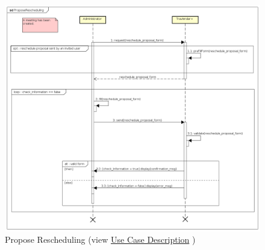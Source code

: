\begin{figure}[h]
\centering\includegraphics[width=\textwidth]{Images/SequenceDiagrams/Admin/ProposeRescheduling.png}{}
\caption[Propose Rescheduling]{{Propose Rescheduling}\label{SeqDiagr:ProposeRes} (view \hyperref[UseCaseDescr:ProposeRes]{Use Case Description} )}
\end{figure}

\clearpage